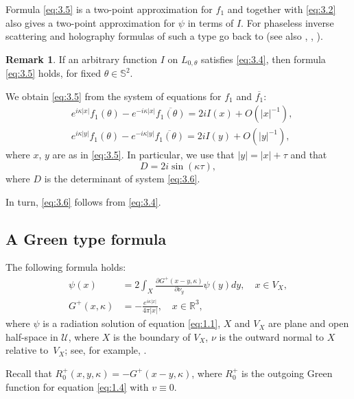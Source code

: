 \documentclass[10pt,a4paper]{amsart}
\newcommand{\RR}{\mathbb R}
\theoremstyle{definition}
\newtheorem{remark}{Remark}
\begin{document}
Formula \eqref{eq:3.5} is a two-point approximation for $f_1$ and together with \eqref{eq:3.2} also gives a two-point approximation for $\psi$
in terms of $I$.
For phaseless inverse scattering and holography formulas of such a type go back to \cite{N1} (see also \cite{NS2}, \cite{NSh}, \cite{N5}).


\setcounter{remark}{3}
\begin{remark}\label{rem:4}
If an arbitrary function $I$ on $L_{0, \theta}$ satisfies \eqref{eq:3.4},
then formula \eqref{eq:3.5} holds, for fixed $\theta\in\mathbb S^2$.
\end{remark}

We obtain \eqref{eq:3.5} from the system of equations for $f_1$ and $\overline {f_1}$:
\begin{equation}\label{eq:3.6}
\begin{aligned}
&e^{i\kappa|x|}f_1(\theta)-e^{-i\kappa|x|} \overline {f_1(\theta)}=2iI(x)+O(|x|^{-1}),\\
&e^{i\kappa|y|}f_1(\theta)-e^{-i\kappa|y|} \overline {f_1(\theta)}=2iI(y)+O(|y|^{-1}),
\end{aligned}
\end{equation}
where $x$, $y$ are as in \eqref{eq:3.5}. In particular, we use that $|y|=|x|+\tau$ and that
\begin{equation}
\label{eq:3.7}
D=2i \sin(\kappa\tau),
\end{equation}
where $D$ is the determinant of system \eqref{eq:3.6}.

In turn, \eqref{eq:3.6} follows from \eqref{eq:3.4}.

\subsection{A Green type formula}\label{subsec:3.3}

The following formula holds:
\begin{align}
\psi(x)&= 2\int_{X}\frac{\partial G^+(x-y,\kappa)}{\partial \nu_{y}}\psi(y)dy,\quad x\in V_X, \label{eq:3.8a}\\
G^+(x,\kappa)&= -\frac{e^{i\kappa|x|}}{4\pi|x|},\quad x\in \RR^3, \label{eq:3.8b}
\end{align}
where $\psi$ is a radiation solution of equation \eqref{eq:1.1}, $X$ and $V_X$ are plane and open half-space in $\mathcal{U}$,
where $X$ is the boundary of $V_X$, $\nu$ is the outward normal to $X$ relative to~$V_X$; see, for example, \cite[Eq.\,(5.84)]{BR}.

Recall that $R_0^+(x, y, \kappa)=-G^+(x-y,\kappa)$, where $R_0^+$ is the outgoing Green function for equation \eqref{eq:1.4} with $v \equiv 0$.
\end{document}
